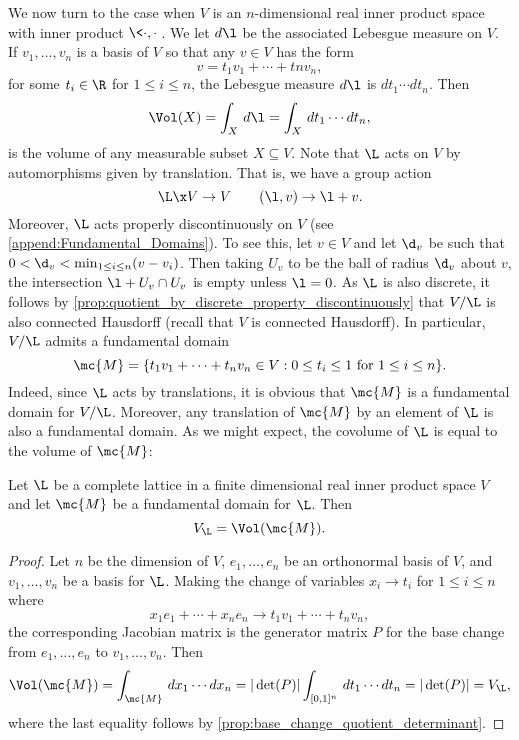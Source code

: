     We now turn to the case when $V$ is an $n$-dimensional real inner product space with inner product $\<\cdot,\cdot\>$. We let $d\l$ be the associated Lebesgue measure on $V$. If $v_{1},\ldots,v_{n}$ is a basis of $V$ so that any $v \in V$ has the form
    \[
      v = t_{1}v_{1}+\cdots+t{n}v_{n},
    \]
    for some $t_{i} \in \R$ for $1 \le i \le n$, the Lebesgue measure $d\l$ is $dt_{1} \cdots dt_{n}$. Then
    \[
      \Vol(X) = \int_{X}\,d\l = \int_{X}\,dt_{1} \cdots dt_{n},
    \]
    is the volume of any measurable subset $X \subseteq V$. Note that $\L$ acts on $V$ by automorphisms given by translation. That is, we have a group action
    \[
      \L \x V \to V \qquad (\l,v) \to \l+v.
    \]
    Moreover, $\L$ acts properly discontinuously on $V$ (see \cref{append:Fundamental_Domains}). To see this, let $v \in V$ and let $\d_{v}$ be such that $0 < \d_{v} < \min_{1 \le i \le n}(v-v_{i})$. Then taking $U_{v}$ to be the ball of radius $\d_{v}$ about $v$, the intersection $\l+U_{v} \cap U_{v}$ is empty unless $\l = 0$. As $\L$ is also discrete, it follows by \cref{prop:quotient_by_discrete_property_discontinuously} that $V/\L$ is also connected Hausdorff (recall that $V$ is connected Hausdorff). In particular, $V/\L$ admits a fundamental domain
    \[
      \mc{M} = \{t_{1}v_{1}+\cdots+t_{n}v_{n} \in V:\text{$0 \le t_{i} \le 1$ for $1 \le i \le n$}\}.
    \]
    Indeed, since $\L$ acts by translations, it is obvious that $\mc{M}$ is a fundamental domain for $V/\L$. Moreover, any translation of $\mc{M}$ by an element of $\L$ is also a fundamental domain. As we might expect, the covolume of $\L$ is equal to the volume of $\mc{M}$:

    \begin{proposition}\label{prop:covolume_equals_volume_of_fundamental_domain}
      Let $\L$ be a complete lattice in a finite dimensional real inner product space $V$ and let $\mc{M}$ be a fundamental domain for $\L$. Then
      \[
        V_{\L} = \Vol(\mc{M}).
      \]
    \end{proposition}
    \begin{proof}
      Let $n$ be the dimension of $V$, $e_{1},\ldots,e_{n}$ be an orthonormal basis of $V$, and $v_{1},\ldots,v_{n}$ be a basis for $\L$. Making the change of variables $x_{i} \to t_{i}$ for $1 \le i \le n$ where
      \[
        x_{1}e_{1}+\cdots+x_{n}e_{n} \to t_{1}v_{1}+\cdots+t_{n}v_{n},
      \]
      the corresponding Jacobian matrix is the generator matrix $P$ for the base change from $e_{1},\ldots,e_{n}$ to $v_{1},\ldots,v_{n}$. Then
      \[
        \Vol(\mc{M}) = \int_{\mc{M}}\,dx_{1} \cdots dx_{n} = |\det(P)|\int_{[0,1]^{n}}\,dt_{1} \cdots dt_{n} = |\det(P)| = V_{\L},
      \]
      where the last equality follows by \cref{prop:base_change_quotient_determinant}.
    \end{proof}

